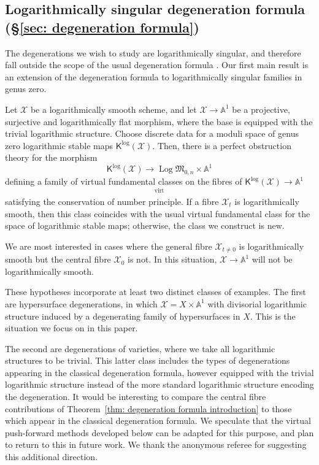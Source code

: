 \documentclass[11pt]{amsart}
\theoremstyle{definition}
\newenvironment{customthm}[1]
  {\renewcommand\theinnercustomthm{#1}\innercustomthm}
  {\endinnercustomthm}
\theoremstyle{definition}
\newcommand{\op}[1]{\operatorname{#1}}
\newcommand{\Aaff}{\mathbb{A}}
\newcommand{\virt}{\op{virt}}
\newcommand{\Xcal}{\mathcal{X}}
\newcommand{\Mfrak}{\mathfrak{M}}
\newcommand{\Kup}{\mathsf{K}}
\newcommand{\Log}{\operatorname{Log}}
\begin{document}
\subsection{Logarithmically singular degeneration formula (\S \ref{sec: degeneration formula})} The degenerations we wish to study are logarithmically singular, and therefore fall outside the scope of the usual degeneration formula \cite{AbramovichChenGrossSiebertDegeneration, ACGSPunctured}. Our first main result is an extension of the degeneration formula to logarithmically singular families in genus zero.

\begin{customthm}{A}[Theorems~\ref{prop: POT over A1} and \ref{thm: degeneration formula}] \label{thm: degeneration formula introduction} Let $\Xcal$ be a logarithmically smooth scheme, and let $\Xcal \to \Aaff^{\! 1}$ be a projective, surjective and logarithmically flat morphism, where the base is equipped with the trivial logarithmic structure. Choose discrete data for a moduli space of genus zero logarithmic stable maps $\Kup^{\log}(\Xcal)$. Then, there is a perfect obstruction theory for the morphism
\begin{equation*} \Kup^{\log}(\Xcal) \to \Log \Mfrak_{0,n} \times \Aaff^{\! 1}	
\end{equation*}
defining a family of virtual fundamental classes on the fibres of $\Kup^{\log}(\Xcal) \to \Aaff^{\! 1}$
\begin{equation*} [\Kup^{\log}(\Xcal_t)]^{\virt} \end{equation*}
satisfying the conservation of number principle. If a fibre $\Xcal_t$ is logarithmically smooth, then this class coincides with the usual virtual fundamental class for the space of logarithmic stable maps; otherwise, the class we construct is new.\end{customthm}

We are most interested in cases where the general fibre $\Xcal_{t \neq 0}$ is logarithmically smooth but the central fibre $\Xcal_0$ is not. In this situation, $\Xcal \to \Aaff^{\! 1}$ will not be logarithmically smooth.

These hypotheses incorporate at least two distinct classes of examples. The first are hypersurface degenerations, in which $\Xcal = X \times \Aaff^{\! 1}$ with divisorial logarithmic structure induced by a degenerating family of hypersurfaces in $X$. This is the situation we focus on in this paper.

The second are degenerations of varieties, where we take all logarithmic structures to be trivial. This latter class includes the types of degenerations appearing in the classical degeneration formula, however equipped with the trivial logarithmic structure instead of the more standard logarithmic structure encoding the degeneration. It would be interesting to compare the central fibre contributions of Theorem~\ref{thm: degeneration formula introduction} to those which appear in the classical degeneration formula. We speculate that the virtual push-forward methods developed below can be adapted for this purpose, and plan to return to this in future work. We thank the anonymous referee for suggesting this additional direction.
\end{document}

